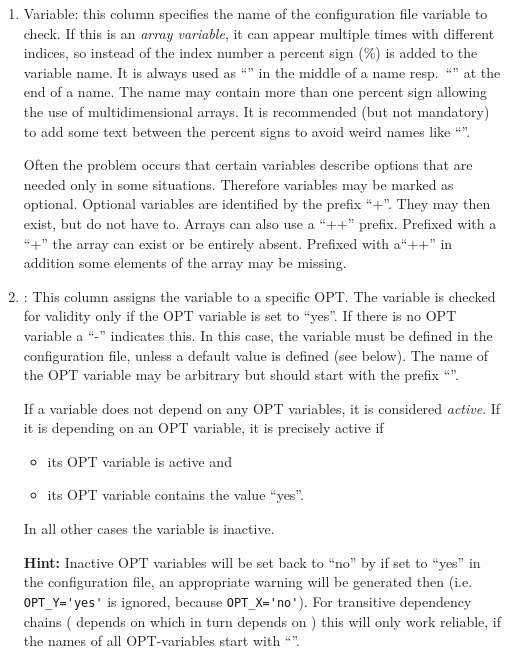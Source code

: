 \begin{enumerate}

\item Variable: this column specifies the name of the configuration file
  variable to check. If this is an \emph{array variable}, it can appear
  multiple times with different indices, so instead of the index number a percent
  sign (\%) is added to the variable name. It is always used as ``\var{\_\%\_}''
  in the middle of a name resp.\ ``\var{\_\%}'' at the end of a name. The name
  may contain more than one percent sign allowing the use of multidimensional
  arrays. It is recommended (but not mandatory) to add some text between
  the percent signs to avoid weird names like ``''.

  Often the problem occurs that certain variables describe options that are
  needed only in some situations. Therefore variables may be marked as optional.
  Optional variables are identified by the prefix ``+''. They may then exist,
  but do not have to. Arrays can also use a ``++'' prefix. Prefixed with a ``+''
  the array can exist or be entirely absent.  Prefixed with a``++'' in addition
  some elements of the array may be missing.

\item {}: This column assigns the variable to a specific OPT.
  The variable is checked for validity only if the OPT variable is set to ``yes''.
  If there is no OPT variable a ``-'' indicates this. In this case,
  the variable must be defined in the configuration file, unless a default
  value is defined (see below). The name of the OPT variable may be arbitrary
  but should start with the prefix ``''.

  If a variable does not depend on any OPT variables, it is considered
  \emph{active}. If it is depending on an OPT variable, it is precisely
  active if

  \begin{itemize}
  \item its OPT variable is active and
  \item its OPT variable contains the value ``yes''.
  \end{itemize}

  In all other cases the variable is inactive.

  \textbf{Hint:} Inactive OPT variables will be set back to ``no'' by
   if set to ``yes'' in the configuration file, an appropriate
  warning will be generated then (i.e. \verb+OPT_Y='yes'+ is ignored, because
  \verb+OPT_X='no'+). For transitive dependency chains ( depends
  on  which in turn depends on ) this will only work
  reliable, if the names of all OPT-variables start with ``''.


\end{enumerate}

